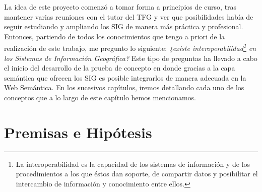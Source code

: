 La idea de este proyecto comenzó a tomar forma a principios de curso, tras mantener varias reuniones con el tutor del TFG y ver que posibilidades había de seguir estudiando y ampliando los SIG de manera más práctica y profesional. Entonces, partiendo de todos los conocimientos que tengo a priori de la realización de este trabajo, me pregunto lo siguiente: \textit{¿existe interoperabilidad\footnote{La interoperabilidad es la capacidad de los sistemas de información y de los procedimientos a los que éstos dan soporte, de compartir datos y posibilitar el intercambio de información y conocimiento entre ellos.} en los Sistemas de Información Geográfica?} Este tipo de preguntas ha llevado a cabo el inicio del desarrollo de la prueba de concepto en donde gracias a la capa semántica que ofrecen los SIG es posible integrarlos de manera adecuada en la Web Semántica. En los sucesivos capítulos, iremos detallando cada uno de los conceptos que a lo largo de este capítulo hemos mencionamos.





\section{Premisas e Hipótesis}


